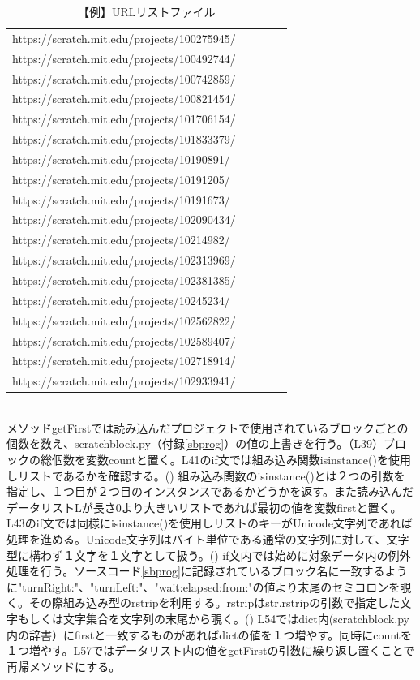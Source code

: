\documentclass[a4paper,10pt,onecolumn,oneside,openany]{jsbook}
\begin{document}
\begin{table}[h]
 \caption{【例】URLリストファイル}
 \label{urllist}
 \begin{center}
\begin{tabular}{lclcl}
https://scratch.mit.edu/projects/100275945/ \\
https://scratch.mit.edu/projects/100492744/ \\
https://scratch.mit.edu/projects/100742859/ \\
https://scratch.mit.edu/projects/100821454/ \\
https://scratch.mit.edu/projects/101706154/ \\
https://scratch.mit.edu/projects/101833379/ \\
https://scratch.mit.edu/projects/10190891/ \\
https://scratch.mit.edu/projects/10191205/ \\
https://scratch.mit.edu/projects/10191673/ \\
https://scratch.mit.edu/projects/102090434/ \\
https://scratch.mit.edu/projects/10214982/ \\
https://scratch.mit.edu/projects/102313969/ \\
https://scratch.mit.edu/projects/102381385/ \\
https://scratch.mit.edu/projects/10245234/ \\
https://scratch.mit.edu/projects/102562822/ \\
https://scratch.mit.edu/projects/102589407/ \\
https://scratch.mit.edu/projects/102718914/ \\
https://scratch.mit.edu/projects/102933941/ \\
\end{tabular}
\end{center}
\end{table}
\\
メソッドgetFirstでは読み込んだプロジェクトで使用されているブロックごとの個数を数え、scratchblock.py（付録\ref{sbprog}）の値の上書きを行う。（L39）ブロックの総個数を変数countと置く。L41のif文では組み込み関数isinstance()を使用しリストであるかを確認する。(\cite{isinstance}) 組み込み関数のisinstance()とは２つの引数を指定し、１つ目が２つ目のインスタンスであるかどうかを返す。また読み込んだデータリストLが長さ0より大きいリストであれば最初の値を変数firstと置く。L43のif文では同様にisinstance()を使用しリストのキーがUnicode文字列であれば処理を進める。Unicode文字列はバイト単位である通常の文字列に対して、文字型に構わず１文字を１文字として扱う。(\cite{unicode}) if文内では始めに対象データ内の例外処理を行う。ソースコード\ref{sbprog}に記録されているブロック名に一致するように"turnRight:"、"turnLeft:"、"wait:elapsed:from:"の値より末尾のセミコロンを覗く。その際組み込み型のrstripを利用する。rstripはstr.rstripの引数で指定した文字もしくは文字集合を文字列の末尾から覗く。(\cite{rstrip}) L54ではdict内(scratchblock.py内の辞書）にfirstと一致するものがあればdictの値を１つ増やす。同時にcountを１つ増やす。L57ではデータリスト内の値をgetFirstの引数に繰り返し置くことで再帰メソッドにする。
\end{document}
